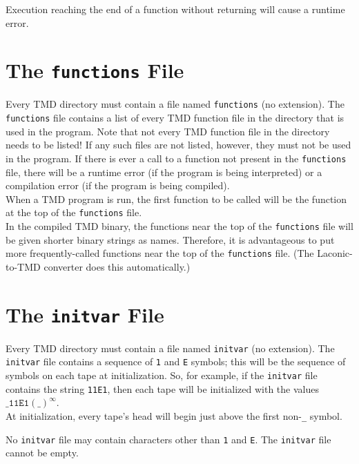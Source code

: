 \documentclass[11pt]{article}
\begin{document}
Execution reaching the end of a function without returning will cause a runtime error. \\

\section{The \texttt{functions} File}

Every TMD directory must contain a file named \texttt{functions} (no extension). The \texttt{functions} file contains a list of every TMD function file in the directory that is used in the program. Note that not every TMD function file in the directory needs to be listed! If any such files are not listed, however, they must not be used in the program. If there is ever a call to a function not present in the \texttt{functions} file, there will be a runtime error (if the program is being interpreted) or a compilation error (if the program is being compiled). \\

When a TMD program is run, the first function to be called will be the function at the top of the \texttt{functions} file. \\

In the compiled TMD binary, the functions near the top of the \texttt{functions} file will be given shorter binary strings as names. Therefore, it is advantageous to put more frequently-called functions near the top of the \texttt{functions} file. (The Laconic-to-TMD converter does this automatically.)

\section{The \texttt{initvar} File}

Every TMD directory must contain a file named \texttt{initvar} (no extension). The \texttt{initvar} file contains a sequence of \texttt{1} and \texttt{E} symbols; this will be the sequence of symbols on each tape at initialization. So, for example, if the \texttt{initvar} file contains the string \texttt{11E1}, then each tape will be initialized with the values $\texttt{\_11E1}(\texttt{\_})^{\infty}$. \\

At initialization, every tape's head will begin just above the first non-\texttt{\_} symbol.

No \texttt{initvar} file may contain characters other than \texttt{1} and \texttt{E}. The \texttt{initvar} file cannot be empty.
\end{document}
